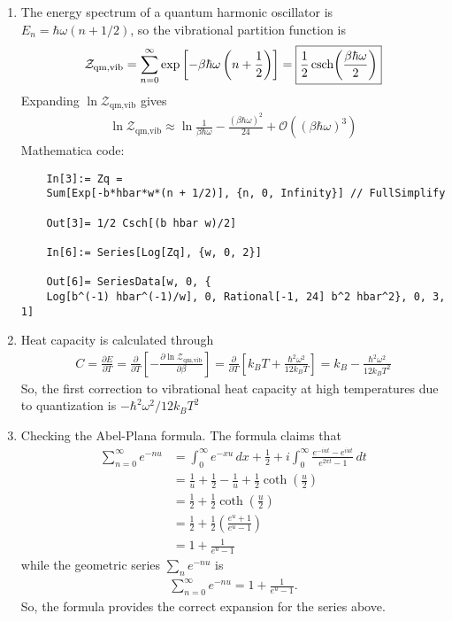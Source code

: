 \documentclass{article}
\theoremstyle{definition}
\newcommand{\p}{\partial}
\newcommand{\be}{\beta}
\newcommand{\f}[2]{\frac{#1}{#2}}
\newcommand{\lp}{\left(}
\newcommand{\rp}{\right)}
\newcommand{\lb}{\left[}
\newcommand{\rb}{\right]}
\begin{document}
\begin{enumerate}[label=(\alph*)]
	\item The energy spectrum of a quantum harmonic oscillator is $E_n = \hbar \omega (n + 1/2)$, so the vibrational partition function is 
	\begin{align*}
	\mathcal{Z}_\text{qm,vib} = \sum^\infty_{n=0} \exp\lb -\be \hbar \omega\lp n + \f{1}{2} \rp \rb = \boxed{\f{1}{2}\csch(\f{\be \hbar \omega}{2})}
	\end{align*}
	Expanding $\ln \mathcal{Z}_\text{qm,vib}$ gives
	\begin{align*}
	\boxed{\ln \mathcal{Z}_\text{qm,vib} \approx \ln \f{1}{\be \hbar \omega} - \f{(\be \hbar \omega)^2}{24} + \mathcal{O}((\be \hbar \omega)^3)}
	\end{align*}
	Mathematica code:
	\begin{lstlisting}
	In[3]:= Zq = 
	Sum[Exp[-b*hbar*w*(n + 1/2)], {n, 0, Infinity}] // FullSimplify
	
	Out[3]= 1/2 Csch[(b hbar w)/2]
	
	In[6]:= Series[Log[Zq], {w, 0, 2}]
	
	Out[6]= SeriesData[w, 0, {
	Log[b^(-1) hbar^(-1)/w], 0, Rational[-1, 24] b^2 hbar^2}, 0, 3, 1]
	\end{lstlisting}
	
	
	\item Heat capacity is calculated through 
	\begin{align*}
	C = \f{\p E}{\p T} = \f{\p }{\p T}\lb - \f{\p \ln \mathcal{Z}_\text{qm,vib} }{\p \be} \rb = \f{\p }{\p T}\lb k_BT + \f{\hbar^2 \omega^2}{12 k_BT}\rb = k_B - \f{\hbar^2 \omega^2}{12 k_B T^2}
	\end{align*}
	So, the first correction to vibrational heat capacity at high temperatures due to quantization is $\boxed{- \hbar^2 \omega^2/12 k_B T^2}$
	
	\item Checking the Abel-Plana formula. The formula claims that
	\begin{align*}
	\sum^\infty_{n=0} e^{-nu} 
	&= \int^\infty_0 e^{-xu}\,dx + \f{1}{2} + i\int^\infty_0 \f{e^{-iut} - e^{iut}}{e^{2\pi t} - 1}\,dt \\
	&= \f{1}{u} + \f{1}{2} - \f{1}{u} + \f{1}{2}\coth(\f{u}{2})\\
	&=  \f{1}{2} + \f{1}{2}\coth(\f{u}{2}) \\
	&= \f{1}{2} + \f{1}{2}\lp \f{e^u + 1}{ e^u - 1} \rp \\
	&= 1 + \f{1}{e^u - 1} 
	\end{align*}
	while the geometric series $\sum_n e^{-nu}$ is 
	\begin{align*}
	\sum^\infty_{n=0} e^{-nu} = 1 + \f{1}{e^u - 1}.
	\end{align*}
	So, the formula provides the correct expansion for the series above. 
	

\end{enumerate}
\end{document}
